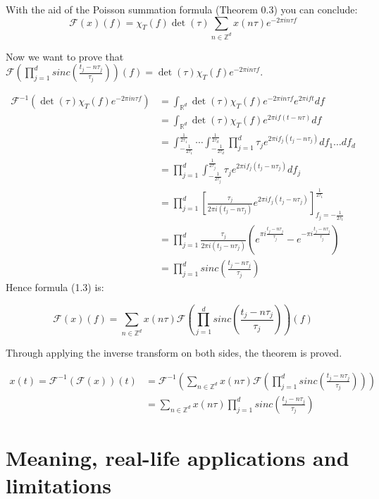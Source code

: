 \documentclass[a4paper, 11pt]{scrreprt}
\newcommand{\RR}{\mathbb{R}}
\newcommand{\ZZ}{\mathbb{Z}}
\newcommand{\FF}{\mathcal{F}}
\begin{document}
With the aid of the Poisson summation formula (Theorem 0.3) you can conclude:
\begin{equation}
\FF(x)(f) = \chi_{T}(f) \det(\tau) \sum_{n \in \ZZ^d} x(n\tau)e^{-2\pi i n\tau f}
\end{equation}

Now we want to prove that \(\FF\left( \prod_{j=1}^d sinc \left( \frac{t_j-n\tau_j}{\tau_j}\right)\right)(f) = \det(\tau)\chi_{T}(f)e^{-2\pi in\tau f}\).

\begin{align*}
\FF^{-1}\left( \det(\tau) \chi_{T}(f) e^{-2 \pi i n \tau f}\right) 
&= \int_{\RR^d} \det(\tau) \chi_{T}(f) e^{-2 \pi i n \tau f} e^{2 \pi i f t} df \\
&= \int_{\RR^d} \det(\tau) \chi_{T}(f) e^{2 \pi i f (t-n\tau) }df \\
&= \int_{-\frac{1}{2\tau_1}}^{\frac{1}{2\tau_1}} \cdots \int_{-\frac{1}{2\tau_d}}^{\frac{1}{2\tau_d}} \prod_{j=1}^d \tau_j e^{2 \pi i f_j(t_j-n \tau_j)}df_1 \ldots df_d \\
&= \prod_{j=1}^d \int_{-\frac{1}{2\tau_j}}^{\frac{1}{2\tau_j}} \tau_j e^{2 \pi i f_j (t_j - n \tau_j)}df_j \\
&= \prod_{j=1}^d \left[  \frac{\tau_j}{2 \pi i (t_j - n \tau_j)} e^{2 \pi i f_j (t_j - n \tau_j)} \right]_{f_j = -\frac{1}{2\tau_1}}^{\frac{1}{2\tau_1}} \\
&= \prod_{j=1}^d \frac{\tau_j}{2 \pi i (t_j - n \tau_j)} \left( e^{\pi i \frac{t_j - n \tau_j}{\tau_j}} - e^{-\pi i \frac{t_j - n \tau_j}{\tau_j}} \right) \\
&= \prod_{j=1}^d sinc \left( \frac{t_j - n \tau_j}{\tau_j} \right)
\end{align*}
Hence formula (1.3) is:

\[\FF(x)(f) = \sum_{n \in \ZZ^d} x(n\tau) \FF\left(\prod_{j=1}^d sinc \left( \frac{t_j - n \tau_j}{\tau_j} \right) \right)(f)\]

Through applying the inverse transform on both sides, the theorem is proved.

\begin{align*}
x(t) = \FF^{-1}(\FF(x))(t) &= \FF^{-1} \left( \sum_{n \in \ZZ^d} x(n \tau) \FF \left( \prod_{j=1}^d sinc \left( \frac{t_j - n \tau_j}{\tau_j} \right) \right) \right) \\
&= \sum_{n \in \ZZ^d} x(n\tau) \prod_{j=1}^d sinc \left( \frac{t_j - n \tau_j}{\tau_j} \right)
\end{align*}

\section{Meaning, real-life applications and limitations}
\end{document}
